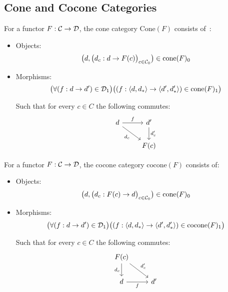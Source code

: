 \subsection{Cone and Cocone Categories}
\begin{definition}
  For a functor $F:\mathcal{C}\to \mathcal{D}$, the cone category $\mathrm{Cone}(F)$ consists
  of~\parencite[p.~75]{riehl:category_theory_in_context}:
  \begin{itemize}
    \item Objects:
      \[\big(d, \big(d_c: d \to F(c)\big)_{c\in \mathcal{C}_0}\big)\in
        \mathrm{cone}(F)_0\]
    \item Morphisms:
      \[\big(\forall (f : d \to d') \in \mathcal{D}_1\big)
        \big((f: \langle d, d_*\rangle\to \langle d', d'_*\rangle) \in \mathrm{cone}(F)_1\big)\]

      Such that for every $c\in C$ the following commutes:
      \[\begin{tikzcd}
        d & {d'} \\
        & {F(c)}
        \arrow["{d_c}"', from=1-1, to=2-2]
        \arrow["{d'_c}", from=1-2, to=2-2]
        \arrow["f", from=1-1, to=1-2]
      \end{tikzcd}\]
  \end{itemize}
\end{definition}

\begin{definition}
  For a functor $F:\mathcal{C}\to \mathcal{D}$, the cocone category $\mathrm{cocone}(F)$ consists
  of:

  \begin{itemize}
    \item Objects:
      \[\big(d, \big(d_c: F(c) \to d\big)_{c\in \mathcal{C}_0}\big)\in
        \mathrm{cone}(F)_0\]
    \item Morphisms:
      \[\big(\forall (f : d\to d')\in \mathcal{D}_1\big)
        \big((f:\langle d, d_*\rangle\to \langle d', d'_*\rangle)\in \mathrm{cocone}(F)_1\big)\]

      Such that for every $c\in C$ the following commutes:
      \[\begin{tikzcd}[ampersand replacement=\&]
        {F(c)} \\
        d \& {d'}
        \arrow["{d_c}"', from=1-1, to=2-1]
        \arrow["{d'_c}", from=1-1, to=2-2]
        \arrow["f"', from=2-1, to=2-2]
      \end{tikzcd}\]
  \end{itemize}
\end{definition}